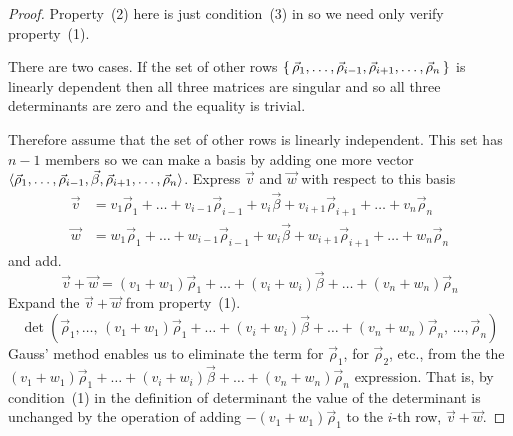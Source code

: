 \begin{proof}
Property~(2) here is just condition~(3) in 
so we need only verify property~(1).

There are two cases.
If the set of other rows
\(
  \mbox{$\{\,\vec{\rho}_1,\dots,\vec{\rho}_{i-1},\vec{\rho}_{i+1},
       \dots,\vec{\rho}_n\,\}$} 
\)
is linearly dependent then all three matrices are singular and so all
three determinants are zero and the equality is trivial.

Therefore assume that the set of other rows is linearly independent.
This set has $n-1$ members so we can make a basis by 
adding one more vector
$\langle\vec{\rho}_1,\dots,\vec{\rho}_{i-1},\vec{\beta},
               \vec{\rho}_{i+1},\dots,\vec{\rho}_n\rangle$.
Express $\vec{v}$ and $\vec{w}$ with respect to this basis
\begin{align*}
  \vec{v} &=v_1\vec{\rho}_1+\dots+v_{i-1}\vec{\rho}_{i-1}+v_i\vec{\beta}
            +v_{i+1}\vec{\rho}_{i+1}+\dots+v_n\vec{\rho}_n                \\
  \vec{w} &= w_1\vec{\rho}_1+\dots+w_{i-1}\vec{\rho}_{i-1}+w_i\vec{\beta}
            +w_{i+1}\vec{\rho}_{i+1}+\dots+w_n\vec{\rho}_n
\end{align*}
and add.
\begin{equation*}
  \vec{v}+\vec{w}
  =
  (v_1+w_1)\vec{\rho}_1+\dots+(v_i+w_i)\vec{\beta}
            +\dots+(v_n+w_n)\vec{\rho}_n 
\end{equation*}
Expand the $\vec{v}+\vec{w}$ from property~(1).
\begin{equation*}
    \det (\vec{\rho}_1,\dots,\,(v_1+w_1)\vec{\rho}_1+\dots+(v_i+w_i)\vec{\beta}
            +\dots+(v_n+w_n)\vec{\rho}_n,\,\dots,\vec{\rho}_n) 
\end{equation*}
Gauss' method enables us to eliminate the term for $\vec{\rho}_1$, for
$\vec{\rho}_2$, etc., from the
the $(v_1+w_1)\vec{\rho}_1+\dots+(v_i+w_i)\vec{\beta}
            +\dots+(v_n+w_n)\vec{\rho}_n$ expression.
That is, by condition~(1) in the definition of determinant the value of 
the determinant
is unchanged by the operation of 
adding $-(v_1+w_1)\vec{\rho}_1$ to the $i$-th row, $\vec{v}+\vec{w}$.

\end{proof}
